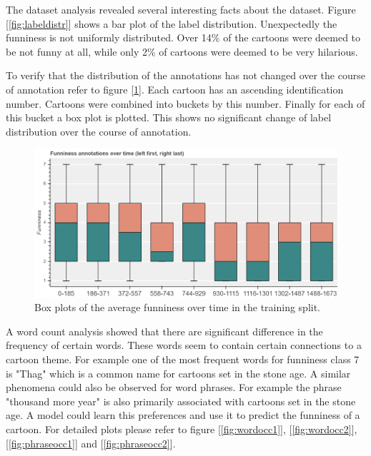 \documentclass[draft,final,oneside]{vutinfth} %
\begin{document}
The dataset analysis revealed several interesting facts about the dataset. Figure [\ref{fig:labeldistr}] shows a bar plot of the label distribution. Unexpectedly the funniness is not uniformly distributed. Over 14\% of the cartoons were deemed to be not funny at all, while only 2\% of cartoons were deemed to be very hilarious.

To verify that the distribution of the annotations has not changed over the course of annotation refer to figure [\ref{fig:boxplottime}]. Each cartoon has an ascending identification number. Cartoons were  combined into buckets by this number. Finally for each of this bucket a box plot is plotted. This shows no significant change of label distribution over the course of annotation.

\begin{figure}
	\centering
  	\includegraphics[width=1.0\textwidth]{graphics/average_funniness_over_time}
	\caption{Box plots of the average funniness over time in the training split.}
	\label{fig:boxplottime}
\end{figure}

A word count analysis showed that there are significant difference in the frequency of certain words. These words seem to contain certain connections to a cartoon theme. For example one of the most frequent words for funniness class 7 is "Thag" which is a common name for cartoons set in the stone age. A similar phenomena could also be observed for word phrases. For example the phrase "thousand more year" is also primarily associated with cartoons set in the stone age. A model could learn this preferences and use it to predict the funniness of a cartoon. For detailed plots please refer to figure [\ref{fig:wordocc1}], [\ref{fig:wordocc2}], [\ref{fig:phraseocc1}] and [\ref{fig:phraseocc2}].
\end{document}
